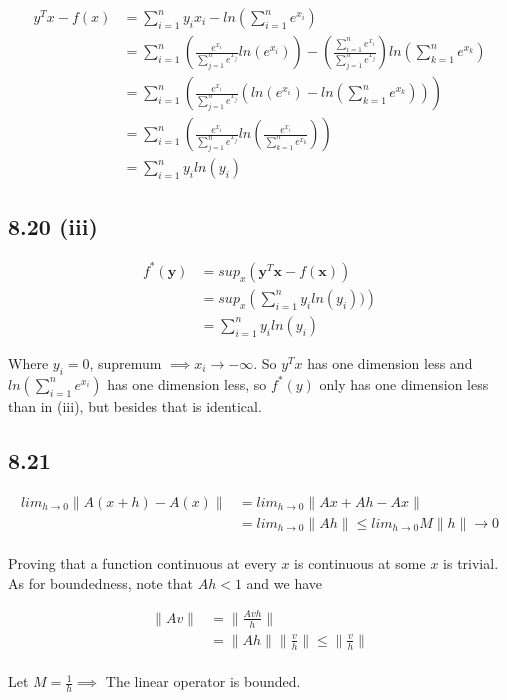 \documentclass[letterpaper,12pt]{article}
\theoremstyle{definition}
\begin{document}
\begin{align*}
y^Tx - f(x) &= \displaystyle\sum_{i=1}^{n}\! y_ix_i - ln\left(\displaystyle\sum_{i=1}^{n}\!e^{x_i}     \right)\\
 &= \displaystyle\sum_{i=1}^{n}\!\left(\frac{e^{x_i}}{\displaystyle\sum_{j=1}^{n}e^{x_j}}ln(e^{x_i})\right) - \left(\frac{\displaystyle\sum_{i=1}^{n}\!e^{x_i}}{\displaystyle\sum_{j=1}^{n}\!e^{x_j}}\right)ln\left(\displaystyle\sum_{k=1}^{n}\!e^{x_k}\right)\\
 &= \displaystyle\sum_{i=1}^{n}\!\left(     \frac{e^{x_i}}{\displaystyle\sum_{j=1}^{n}\!e^{x_j}}\left(  ln(e^{x_i}) - ln\left(\displaystyle\sum_{k=1}^{n}\!e^{x_k}\right)\right)\right)\\
 &= \displaystyle\sum_{i=1}^{n}\!\left( \frac{e^{x_i}}{\displaystyle\sum_{j=1}^{n}\!e^{x_j}}ln\left(\frac{e^{x_i}}{\displaystyle\sum_{k=1}^{n}\!e^{x_k}}\right)    \right)\\
 &= \displaystyle\sum_{i=1}^{n}\!y_i ln(y_i)
\end{align*}

\subsection*{8.20 (iii)}


\begin{align*}
    f^{*}(\mathbf{y}) &= sup_{x} \left( \mathbf {y} ^T \mathbf {x} - f(\mathbf {x})     \right)\\
&= sup_{x} \left( \displaystyle\sum_{i=1}^{n}y_iln(y_i))\right)\\ &= \displaystyle\sum_{i=1}^{n}y_iln(y_i)  
\end{align*}

Where $y_i=0$, supremum $\implies x_i \rightarrow -\infty$. So $y^Tx$ has one dimension less and $ln(\sum_{i=1}^{n}e^{x_i})$ has one dimension less, so $f^*(y)$ only has one dimension less than in (iii), but besides that is identical.

\subsection*{8.21}


\begin{align*}
lim_{h\to 0} \lVert A(x+h) - A(x) \lVert & = lim_{h \rightarrow 0} \lVert Ax + Ah -Ax \lVert \\
												 & = lim_{h \rightarrow 0} \lVert Ah \lVert 
												 \leq lim_{h \rightarrow 0} M \lVert h \lVert \rightarrow 0
\end{align*} \\ 

Proving that a function continuous at every $x$ is continuous at some $x$ is trivial. As for boundedness, note that $Ah < 1$ and we have

\begin{align*}
\lVert Av \lVert & = \lVert \frac{Avh}{h} \lVert \\
				 & = \lVert Ah \lVert \lVert \frac{v}{h} \lVert 
				  \leq \lVert \frac{v}{h} \lVert 
\end{align*} \\ 

Let $M=\frac{1}{h} \implies$ The linear operator is bounded. \\
\end{document}

